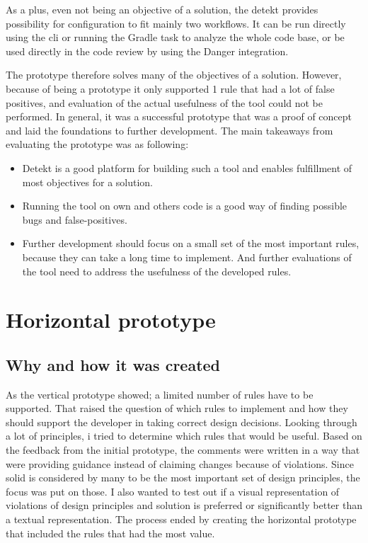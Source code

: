 \documentclass{report}
\begin{document}
As a plus, even not being an objective of a solution, the detekt provides possibility for configuration to fit mainly two workflows. It can be run directly using the \gls{cli} or running the Gradle task to analyze the whole code base, or be used directly in the code review by using the Danger integration.

The prototype therefore solves many of the objectives of a solution. However, because of being a prototype it only supported 1 rule that had a lot of false positives, and evaluation of the actual usefulness of the tool could not be performed. In general, it was a successful prototype that was a proof of concept and laid the foundations to further development. The main takeaways from evaluating the prototype was as following:
\begin{itemize}
    \item Detekt is a good platform for building such a tool and enables fulfillment of most objectives for a solution.
    \item Running the tool on own and others code is a good way of finding possible bugs and false-positives.
    \item Further development should focus on a small set of the most important rules, because they can take a long time to implement. And further evaluations of the tool need to address the usefulness of the developed rules.
\end{itemize}

\section{Horizontal prototype}

\subsection*{Why and how it was created}
As the vertical prototype showed; a limited number of rules have to be supported. That raised the question of which rules to implement and how they should support the developer in taking correct design decisions. Looking through a lot of principles, i tried to determine which rules that would be useful. Based on the feedback from the initial prototype, the comments were written in a way that were providing guidance instead of claiming changes because of violations. Since \gls{solid} is considered by many to be the most important set of design principles, the focus was put on those. I also wanted to test out if a visual representation of violations of design principles and solution is preferred or significantly better than a textual representation. The process ended by creating the horizontal prototype that included the rules that had the most value. 
\end{document}
